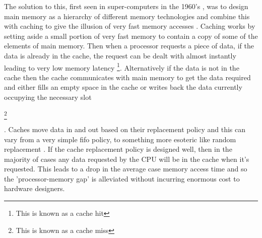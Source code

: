 The solution to this, first seen in super-computers in the 1960's \cite{pattersonComputerOrganizationDesign2018}, was to design main memory as a hierarchy of different memory technologies \cite{wilkesSlaveMemoriesDynamic1965} and combine this with caching to give the illusion of very fast memory accesses \cite{smithCacheMemories1982}. Caching works by setting aside a small portion of very fast memory to contain a copy of some of the elements of main memory. Then when a processor requests a piece of data, if the data is already in the cache, the request can be dealt with almost instantly leading to very low memory latency \footnote{This is known as a cache hit}. Alternatively if the data is not in the cache then the cache communicates with main memory to get the data required and either fills an empty space in the cache or writes back the data currently occupying the necessary slot \begin{NoHyper}\footnote{This is known as a cache miss}\end{NoHyper}. Caches move data in and out based on their replacement policy and this can vary from a very simple \gls{fifo} policy, to something more esoteric like random replacement \cite{al-zoubiPerformanceEvaluationCache2004}. If the cache replacement policy is designed well,  then in the majority of cases any data requested by the CPU will be in the cache when it's requested. This leads to a drop in the average case memory access time and so the 'processor-memory gap' is alleviated without incurring enormous cost to hardware designers.


